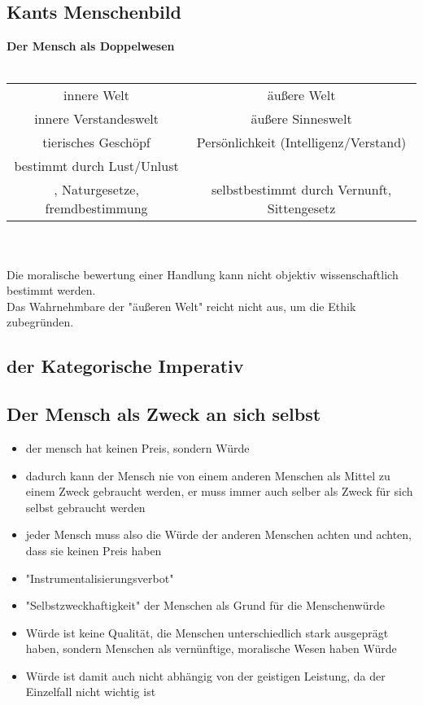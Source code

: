 \documentclass[12pt, letterpaper]{article}
\begin{document}
\subsection{Kants Menschenbild}
\label{sec:Kants Menschenbild}
\textbf{Der Mensch als Doppelwesen}	
\\\\
\begin{tabular}{ c| c }
	innere Welt & äußere Welt\\
	innere Verstandeswelt& äußere Sinneswelt\\
	\hline
	tierisches Geschöpf& Persönlichkeit (Intelligenz/Verstand)\\
	\hline
	bestimmt durch Lust/Unlust\\, Naturgesetze, fremdbestimmung& selbstbestimmt durch Vernunft, Sittengesetz
\end{tabular}
\\\\
Die moralische bewertung einer Handlung kann nicht objektiv wissenschaftlich bestimmt werden.\\
Das Wahrnehmbare der "äußeren Welt" reicht nicht  aus, um die Ethik zubegründen. 
	

\subsection{der Kategorische Imperativ}
\label{sec:der Kategorische Imperativ}

\label{sec:Kant}
\subsection{Der Mensch als Zweck an sich selbst}
\label{sec:Der Mensch als Zweck an sich selbst}
\begin{itemize}
	\item der mensch hat keinen Preis, sondern Würde
	\item dadurch kann der Mensch nie von einem anderen Menschen als Mittel zu einem Zweck gebraucht werden, er muss immer auch selber als Zweck für sich selbst gebraucht werden	
	\item jeder Mensch muss also die Würde der anderen Menschen achten und achten, dass sie keinen Preis haben  
	\item "Instrumentalisierungsverbot"
	\item "Selbstzweckhaftigkeit" der Menschen als Grund für die Menschenwürde
	\item Würde ist keine Qualität, die Menschen unterschiedlich stark ausgeprägt haben, sondern Menschen als vernünftige, moralische Wesen haben Würde
	\item Würde ist damit auch nicht abhängig von der geistigen Leistung, da der Einzelfall nicht wichtig ist

		

\end{itemize}
\newpage
\end{document}
